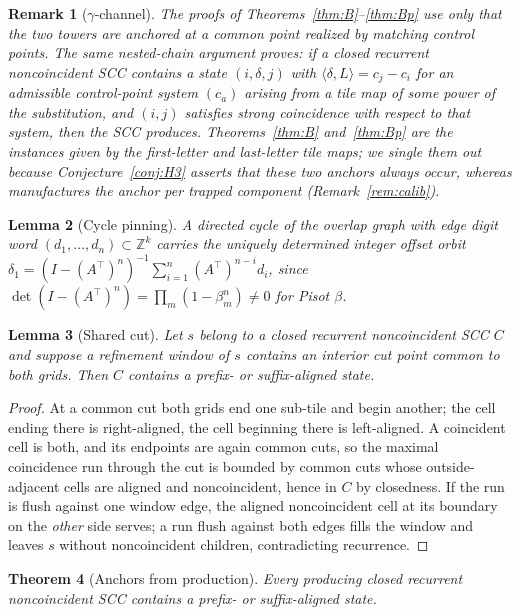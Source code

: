 \documentclass[11pt]{article}
\newtheorem{theorem}{Theorem}[section]
\newtheorem{lemma}[theorem]{Lemma}
\newtheorem{remark}[theorem]{Remark}
\newcommand{\Z}{\mathbb{Z}}
\begin{document}
\begin{remark}[$\gamma$-channel]\label{rem:gchannel}
The proofs of Theorems~\ref{thm:B}--\ref{thm:Bp} use only that the two
towers are anchored at a common point realized by matching control
points. The same nested-chain argument proves: if a closed recurrent
noncoincident SCC contains a state $(i,\delta,j)$ with
$\langle\delta,L\rangle=c_j-c_i$ for an admissible control-point system
$(c_a)$ arising from a tile map of some power of the substitution, and
$(i,j)$ satisfies strong coincidence with respect to that system, then
the SCC produces. Theorems~\ref{thm:B} and~\ref{thm:Bp} are the
instances given by the first-letter and last-letter tile maps; we
single them out because Conjecture~\ref{conj:H3} asserts that these two
anchors always occur, whereas \cite{Ak16} manufactures the anchor per
trapped component (Remark~\ref{rem:calib}).
\end{remark}

\begin{lemma}[Cycle pinning]\label{lem:pin}
A directed cycle of the overlap graph with edge digit word
$(d_1,\dots,d_n)\subset\Z^k$ carries the uniquely determined integer
offset orbit
$\delta_1=(I-(A^{\!\top})^n)^{-1}\sum_{i=1}^{n}(A^{\!\top})^{n-i}d_i$,
since $\det(I-(A^{\!\top})^n)=\prod_m(1-\beta_m^n)\neq0$ for Pisot
$\beta$.
\end{lemma}

\begin{lemma}[Shared cut]\label{lem:cut}
Let $s$ belong to a closed recurrent noncoincident SCC $C$ and suppose a
refinement window of $s$ contains an interior cut point common to both
grids. Then $C$ contains a prefix- or suffix-aligned state.
\end{lemma}

\begin{proof}
At a common cut both grids end one sub-tile and begin another; the cell
ending there is right-aligned, the cell beginning there is left-aligned.
A coincident cell is both, and its endpoints are again common cuts, so
the maximal coincidence run through the cut is bounded by common cuts
whose outside-adjacent cells are aligned and noncoincident, hence in $C$
by closedness. If the run is flush against one window edge, the aligned
noncoincident cell at its boundary on the \emph{other} side serves; a
run flush against both edges fills the window and leaves $s$ without
noncoincident children, contradicting recurrence.
\end{proof}

\begin{theorem}[Anchors from production]\label{thm:C}
Every producing closed recurrent noncoincident SCC contains a prefix- or
suffix-aligned state.
\end{theorem}
\end{document}
